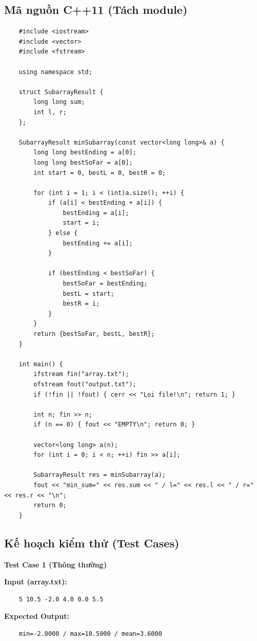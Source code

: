 \subsection{Mã nguồn C++11 (Tách module)}
    \begin{lstlisting}
    #include <iostream>
    #include <vector>
    #include <fstream>

    using namespace std;

    struct SubarrayResult {
        long long sum;
        int l, r;
    };

    SubarrayResult minSubarray(const vector<long long>& a) {
        long long bestEnding = a[0];
        long long bestSoFar = a[0];
        int start = 0, bestL = 0, bestR = 0;

        for (int i = 1; i < (int)a.size(); ++i) {
            if (a[i] < bestEnding + a[i]) {
                bestEnding = a[i];
                start = i;
            } else {
                bestEnding += a[i];
            }

            if (bestEnding < bestSoFar) {
                bestSoFar = bestEnding;
                bestL = start;
                bestR = i;
            }
        }
        return {bestSoFar, bestL, bestR};
    }

    int main() {
        ifstream fin("array.txt");
        ofstream fout("output.txt");
        if (!fin || !fout) { cerr << "Loi file!\n"; return 1; }

        int n; fin >> n;
        if (n == 0) { fout << "EMPTY\n"; return 0; }

        vector<long long> a(n);
        for (int i = 0; i < n; ++i) fin >> a[i];

        SubarrayResult res = minSubarray(a);
        fout << "min_sum=" << res.sum << " / l=" << res.l << " / r=" << res.r << "\n";
        return 0;
    }
\end{lstlisting}

\subsection{Kế hoạch kiểm thử (Test Cases)}

    \textbf{Test Case 1 (Thông thường)}

    \textbf{Input (array.txt):}
    \begin{lstlisting}
    5 10.5 -2.0 4.0 0.0 5.5\end{lstlisting}

    \textbf{Expected Output:}
    \begin{lstlisting}
    min=-2.0000 / max=10.5000 / mean=3.6000\end{lstlisting}

